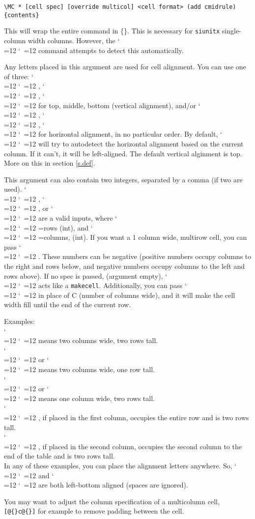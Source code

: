 \documentclass[11pt,parskip=half]{scrartcl}
\newcommand{\llcmd}[1]{\leavevmode\llap{\texttt{\detokenize{#1}\ }}}
\def\cmd{\bgroup\catcode`\\=12 \catcode`\ =12 \cmdA}
\def\cmdA#1{\egroup{\texttt{\detokenize{#1}}}}
\begin{document}
\texttt{\textbackslash MC * [cell spec] [override multicol] <cell format> (add cmidrule)  \{contents\} }

\llcmd{*}This will wrap the entire command in \{\}. This is necessary for \texttt{siunitx} single-column width columns.
However, the \cmd{\MC} command attempts to detect this automatically.

\llcmd{[cell spec]}%
Any letters placed in this argument are used for cell alignment.
You can use one of three: \cmd{t}, \cmd{m}, \cmd{b} for top, middle, bottom (vertical alignment),
and/or \cmd{l}, \cmd{c}, \cmd{r} for horizontal alignment, in no particular order.
By default, \cmd{\MC}   will try to autodetect the horizontal alignment based on the current column.
If it can't, it will be left-aligned.
The default vertical alginment is top. More on this in section \ref{s.def}.

This argument can also contain two integers, separated by a comma (if two are used).
\cmd{C,R}, \cmd{C}, or \cmd{,R} are a valid inputs,
where \cmd{R}=rows (int), and \cmd{C}=columns, (int).
If you want a 1 column wide, multirow cell,
you can pass \cmd{,R}. These numbers can be negative (positive numbers occupy columns to the right
and rows below, and negative numbers occupy columns to the left and rows above).
If no spec is passed, (argument empty), \cmd{\MC}
acts like a \texttt{makecell}.
Additionally, you can pass \cmd{+} in place of C (number of columns wide),
and it will make the cell width fill until the end of the current row.

Examples:\\
\cmd{\MC[2,2]} means two columns wide, two rows tall.\\
\cmd{\MC[2,1]} or \cmd{\MC[2]}  means two columns wide, one row tall.\\
\cmd{\MC[1,2]} or \cmd{\MC[,2]} means one column wide, two rows tall.\\
\cmd{\MC[+,2]}, if placed in the first column, occupies the entire row and is two rows tall.\\
\cmd{\MC[+,2]}, if placed in the second column, occupies the second column to the end of the table and is two rows tall.\\
In any of these examples, you can place the alignment letters anywhere.
So, \cmd{\MC[l1,2b]} and \cmd{\MC[1,2 lb]} are both left-bottom aligned (spaces are ignored).


\llcmd{[override mc]}%
You may want to adjust the column specification of a multicolumn  cell,\\
\texttt{[@\{\}c@\{\}]} for example to remove padding between the cell.
\end{document}
